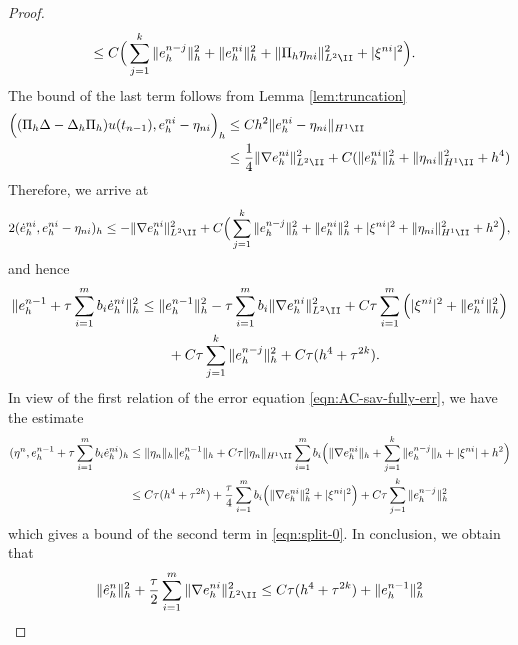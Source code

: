 \begin{proof}
\begin{equation*}
\begin{split}
  &\le C \Big(\sum_{j=1}^k \| e_h^{n-j} \|_h^2 + \|  e_h^{ni} \|_h^2 + \| \Pi_h \eta_{ni} \|_{L^2\II}^2 + |\xi^{ni}|^2 \Big).
\end{split}
\end{equation*}
The bound of the last term follows from Lemma \ref{lem:truncation}
\begin{equation*}
\begin{split}
 \Big(  (\Pi_h \Delta - \Delta_h \Pi_h) u(t_{n-1}), e_h^{ni}-\eta_{ni} \Big)_h &\le C h^2   \| e_h^{ni}-\eta_{ni}   \|_{H^1\II} \\
 &\le  \frac14\| \nabla e_h^{ni}  \|_{L^2\II}^2 + C(\|  e_h^{ni} \|_h^2 + \|  \eta_{ni} \|_{H^1\II}^2+ h^4 )
\end{split}
\end{equation*}
Therefore, we arrive at
\begin{equation*}
2(\dot{e}_h^{ni},e_h^{ni}-\eta_{ni})_h \le  -\|\nabla e_h^{ni}\|_{L^2\II}^2 +
 C \Big(  \sum_{j=1}^k \| e_h^{n-j} \|_h^2 + \|  e_h^{ni} \|_h^2  + |\xi^{ni}|^2 + \| \eta_{ni}\|_{H^1\II}^2 + h^2  \Big),
\end{equation*}
and hence
\begin{align*}
\|e_h^{n-1}+\tau\sum_{i=1}^{m} b_i\dot{e}_h^{ni}\|_h^2
&\leq \|e_h^{n-1}\|_h^2 - \tau\sum_{i=1}^{m}b_i \| \nabla e_h^{ni}  \|_{L^2\II}^2 + C\tau \sum_{i=1}^m \Big( |\xi^{ni}|^2 + \|  e_h^{ni} \|_h^2\Big) \\
&\qquad + C\tau \sum_{j=1}^k \| e_h^{n-j} \|_h^2 + C \tau(h^4+\tau^{2k}).
\end{align*}
In view of the first relation of the error equation \eqref{eqn:AC-sav-fully-err}, we have the estimate
\begin{align*}
(\eta^{n}, e_h^{n-1}+ \tau\sum_{i=1}^{m} b_i\dot{e}_h^{ni})_h
&\le \| \eta_n  \|_h  \|e_h^{n-1}\|_h + C \tau \|  \eta_n \|_{H^1\II} \sum_{i=1}^m b_i
\Big(\| \nabla e_h^{ni} \|_h + \sum_{j=1}^{k} \|  e_h^{n-j} \|_h + |\xi^{ni}| + h^2\Big)\\
&\le C\tau(h^4+ \tau^{2k})   + \frac{\tau}{4}   \sum_{i=1}^m b_i \Big(\| \nabla e_h^{ni} \|_h^2+ |\xi^{ni}|^2 \Big)
+ C\tau  \sum_{j=1}^{k} \|  e_h^{n-j} \|_h^2
\end{align*}
which gives a bound of the second term in \eqref{eqn:split-0}. In conclusion, we obtain that
\begin{equation}\label{eqn:sav-est-01}
\begin{split}
 \|\hat e_h^{n}\|_h^2 + \frac\tau2 \sum_{i=1}^m \| \nabla e_h^{ni} \|_{L^2\II}^2& \le  C\tau(h^4+ \tau^{2k}) +  \|e_h^{n-1}\|_h^2  \\

\end{split}
\end{equation}
\end{proof}
